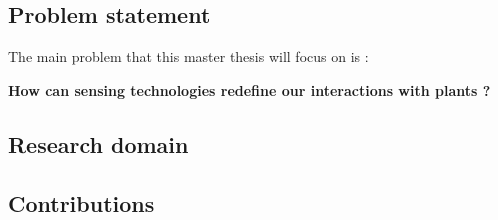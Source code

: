 \subsection{Problem statement}

The main problem that this master thesis will focus on is :

\begin{center}
    \textbf{How can sensing technologies redefine our interactions with plants ?}\\
\end{center}

\subsection{Research domain}

\subsection{Contributions}

\begin{enumerate}

\end{enumerate}
